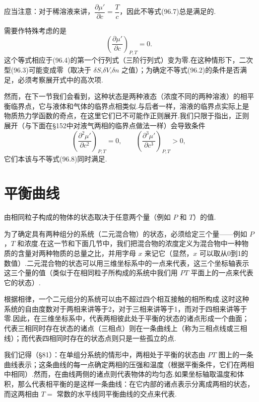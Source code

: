 应当注意：对于稀溶液来讲，$\dfrac{\partial\mu'}{\partial c}=\dfrac{T}{c}$，因此不等式(96.7)总是满足的.

需要作特殊考虑的是
\begin{equation}
  \left(\frac{\partial\mu'}{\partial c}\right)_{P,T}=0.
\end{equation}
这个等式相应于(96.4)的第一个行列式（三阶行列式）变为零.在这种情形下，二次型(96.3)可能变成零（取决于 $\delta S$,$\delta V$,$\delta n$ 之值）；为确定不等式(96.2)的条件是否满足，必须考察展开式中的高次项.

然而，在下一节我们会看到，这种状态是两种液态（浓度不同的两种溶液）的相平衡临界点，它与液体和气体的临界点相类似.与后者一样，溶液的临界点实际上是物质热力学函数的奇点，在这里它们已不可能作正则展开.我们只限于指出，正则展开（与下面在§152中对液气两相的临界点做法一样）会导致条件
\begin{equation}
  \left(\frac{\partial^2\mu'}{\partial c^2}\right)_{P,T}=0,\qquad
  \left(\frac{\partial^3\mu'}{\partial c^3}\right)_{P,T}>0,
\end{equation}
它们本该与不等式(96.8)同时满足.

\section{平衡曲线}

由相同粒子构成的物体的状态取决于任意两个量（例如 $P$ 和 $T$）的值.

为了确定具有两种组分的系统（二元混合物）的状态，必须给定三个量——例如 $P$，$T$ 和浓度.在这一节和下面几节中，我们把混合物的浓度定义为混合物中一种物质的含量对两种物质的总量之比，并用字母 $x$ 来记它（显然，$x$ 可以取从0到1的数值）.二元混合物的状态可以用三维坐标系中的一点来代表，这三个坐标轴表示这三个量的值（类似于在相同粒子所构成的系统中我们用 $PT$ 平面上的一点来代表它的状态）.

根据相律，一个二元组分的系统可以由不超过四个相互接触的相所构成.这时这种系统的自由度数对于两相来讲等于2，对于三相来讲等于1，而对于四相来讲等于零.因此，在三维坐标系中，代表两相彼此处于平衡的状态的诸点形成一个曲面；代表三相同时存在状态的诸点（三相点）则在一条曲线上（称为三相点线或三相线）；而代表四相同时存在的状态点则只是一些孤立的点.

我们记得（§81）：在单组分系统的情形中，两相处于平衡的状态由 $PT$ 图上的一条曲线表示；这条曲线的每一点确定两相的压强和温度（根据平衡条件，它们在两相中相同）.然而，在曲线两侧的诸点则代表物体的均匀态.如果坐标轴取温度和体积，那么代表相平衡的是这样一条曲线：在它内部的诸点表示分离成两相的状态，而这两相由 $T=$ 常数的水平线同平衡曲线的交点来代表.

